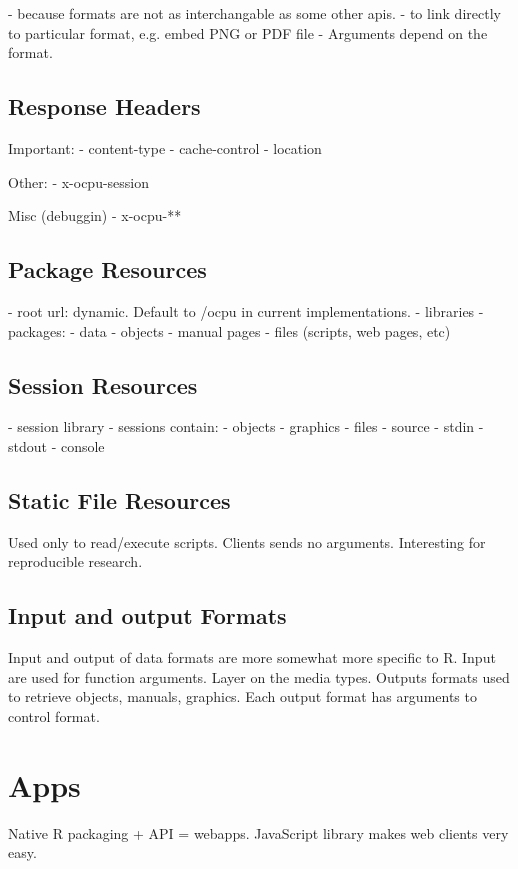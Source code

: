 \documentclass{article}
\begin{document}
 - because formats are not as interchangable as some other apis. 
 - to link directly to particular format, e.g. embed PNG or PDF file
 - Arguments depend on the format. 

\subsection{Response Headers}

Important:
- content-type
- cache-control
- location

Other:
- x-ocpu-session

Misc (debuggin)
- x-ocpu-**

\subsection{Package Resources}

 - root url: dynamic. Default to /ocpu in current implementations.  
 - libraries
   - packages:
     - data
     - objects
     - manual pages
     - files (scripts, web pages, etc)
     
\subsection{Session Resources}

 - session library
 - sessions contain:
   - objects
   - graphics
   - files
   - source
   - stdin
   - stdout
   - console

\subsection{Static File Resources}

Used only to read/execute scripts.
Clients sends no arguments.
Interesting for reproducible research.


\subsection{Input and output Formats}

Input and output of data formats are more somewhat more specific to R.
Input are used for function arguments. Layer on the media types.
Outputs formats used to retrieve objects, manuals, graphics.
Each output format has arguments to control format.

\section{Apps}

Native R packaging + API = webapps.
JavaScript library makes web clients very easy.





\end{document}
